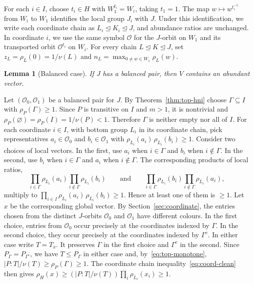\documentclass[10pt]{amsart}
\newtheorem{lemma}[theorem]{Lemma}
\theoremstyle{definition}
\renewcommand{\le}{\leqslant}
\renewcommand{\ge}{\geqslant}
\let\oldendproof\endproof
\renewenvironment{proof}[1][\proofname]{%
  \oldproof[\bfseries #1]%
}{\oldendproof}
\newcommand{\orbit}{\mathcal{O}}
\numberwithin{equation}{section}
\numberwithin{table}{section}
\begin{document}
For each $i\in I$, choose $t_i\in H$ with $W_1^{t_i}=W_i$, taking
$t_1=1$. The map $w\mapsto w^{t_i^{-1}}$ from $W_i$ to $W_1$
identifies the local group $J_i$ with $J$. Under this identification, we
write each coordinate chain as
$L_i\trianglelefteq K_i\trianglelefteq J$, and abundance ratios are
unchanged. In coordinate $i$, we use the same symbol $\orbit$ for the
$J$-orbit on $W_1$ and its transported orbit $\orbit^{t_i}$ on $W_i$.
For every chain $L\trianglelefteq K\trianglelefteq J$, set
$z_L=\rho_L(0)=1/\nu(L)$ and
$n_L=\max_{0\ne w\in W_1}\rho_L(w)$.

\begin{lemma}[Balanced case]\label{lem:branch-balanced}
If $J$ has a balanced pair, then $V$ contains an abundant vector.
\end{lemma}

\begin{proof}
Let $(\orbit_0,\orbit_1)$ be a balanced pair for $J$. By Theorem~\ref{thm:top-hni}
choose $\Gamma\subseteq I$ with $\rho_P(\Gamma)\ge1$. Since $P$ is
transitive on $I$ and $m>1$, it is nontrivial and
$\rho_P(\varnothing)=\rho_P(I)=1/\nu(P)<1$. Therefore $\Gamma$ is
neither empty nor all of $I$. For each coordinate $i\in I$, with bottom group
$L_i$ in its coordinate chain, pick representatives $a_i\in\orbit_0$ and
$b_i\in\orbit_1$ with $\rho_{L_i}(a_i)\,\rho_{L_i}(b_i)\ge1$. Consider two
choices of local vectors. In the first, use $a_i$ when $i\in\Gamma$ and
$b_i$ when $i\notin\Gamma$. In the second, use $b_i$ when $i\in\Gamma$
and $a_i$ when $i\notin\Gamma$. The corresponding products of
local ratios,
$$
  \prod_{i\in\Gamma}\rho_{L_i}(a_i)\prod_{i\notin\Gamma}\rho_{L_i}(b_i)
  \qquad\text{and}\qquad
  \prod_{i\in\Gamma}\rho_{L_i}(b_i)\prod_{i\notin\Gamma}\rho_{L_i}(a_i),
$$
multiply to $\prod_{i\in I}\rho_{L_i}(a_i)\,\rho_{L_i}(b_i)\ge1$. Hence at least one
of them is $\ge1$. Let $x$ be the corresponding global vector. By
Section~\ref{sec:coordinate}, the entries chosen from the distinct
$J$-orbits $\orbit_0$ and $\orbit_1$ have different colours. In the first
choice, entries from $\orbit_0$ occur precisely at the coordinates indexed
by $\Gamma$. In the second choice, they occur precisely at the coordinates
indexed by $\Gamma^c$. In either case write $T=T_x$. It preserves $\Gamma$
in the first choice and $\Gamma^c$ in the second. Since
$P_\Gamma=P_{\Gamma^{c}}$, we have $T\le P_\Gamma$ in
either case and, by~\eqref{eq:top-monotone},
$|P:T|/\nu(T)\ge\rho_P(\Gamma)\ge1$. The coordinate chain
inequality~\eqref{eq:coord-clean} then gives
$\rho_H(x)\ge(|P:T|/\nu(T))\prod_i\rho_{L_i}(x_i)\ge1$.
\end{proof}
\end{document}
